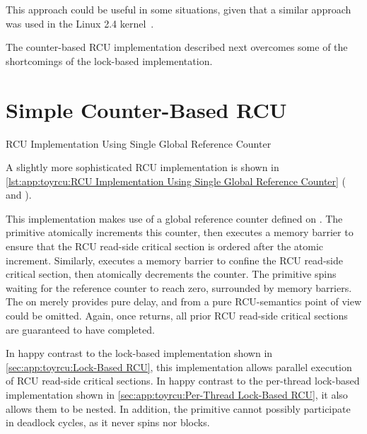 This approach could be useful in some situations, given that a similar
approach was used in the
Linux 2.4 kernel~\cite{Molnar00a}.

The counter-based RCU implementation described next overcomes some of
the shortcomings of the lock-based implementation.

\section{Simple Counter-Based RCU}
\label{sec:app:toyrcu:Simple Counter-Based RCU}

\begin{listing}[tbp]
\vspace*{-11pt}
\caption{RCU Implementation Using Single Global Reference Counter}
\label{lst:app:toyrcu:RCU Implementation Using Single Global Reference Counter}
\end{listing}

A slightly more sophisticated RCU implementation is shown in
\cref{lst:app:toyrcu:RCU Implementation Using Single Global Reference Counter}
( and ).
\begin{lineref}
This implementation makes use of a global reference counter
 defined on .
The  primitive atomically increments this
counter, then executes a memory barrier to ensure that the
RCU read-side critical section is ordered after the atomic
increment.
Similarly,  executes a memory barrier to
confine the RCU read-side critical section, then atomically
decrements the counter.
The  primitive spins waiting for the reference
counter to reach zero, surrounded by memory barriers.
The  on  merely provides pure delay, and from
a pure RCU-semantics point of view could be omitted.
Again, once  returns, all prior
RCU read-side critical sections are guaranteed to have completed.
\end{lineref}

In happy contrast to the lock-based implementation shown in
\cref{sec:app:toyrcu:Lock-Based RCU}, this implementation
allows parallel execution of RCU read-side critical sections.
In happy contrast to the per-thread lock-based implementation shown in
\cref{sec:app:toyrcu:Per-Thread Lock-Based RCU},
it also allows them to be nested.
In addition, the  primitive cannot possibly
participate in deadlock cycles, as it never spins nor blocks.

